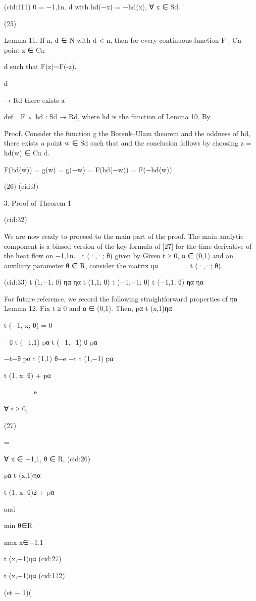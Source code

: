 {(cid:111)
0 = {−1,1}n.
d with hd(−x) = −hd(x), ∀ x ∈ Sd.

(25)

Lemma 11. If n, d ∈ N with d < n, then for every continuous function F : Cn
point z ∈ Cn

d such that F(z)=F(-z).

d

→ Rd there exists a

def= F ◦ hd : Sd → Rd, where hd is the function of Lemma 10. By

Proof. Consider the function g
the Borsuk–Ulam theorem and the oddness of hd, there exists a point w ∈ Sd such that
and the conclusion follows by choosing z = hd(w) ∈ Cn
d.

F(hd(w)) = g(w) = g(−w) = F(hd(−w)) = F(−hd(w))

(26)
(cid:3)

3. Proof of Theorem 1

(cid:32)

We are now ready to proceed to the main part of the proof. The main analytic component is
a biased version of the key formula of [27] for the time derivative of the heat ﬂow on {−1,1}n.

t (·,·; θ) given by
Given t ≥ 0, α ∈ (0,1) and an auxiliary parameter θ ∈ R, consider the matrix ηα





 .
t (·,·; θ).

(cid:33)
t (1,−1; θ)
ηα
ηα
t (1,1; θ)
t (−1,−1; θ)
t (−1,1; θ) ηα
ηα

For future reference, we record the following straightforward properties of ηα
Lemma 12. Fix t ≥ 0 and α ∈ (0,1). Then,
pα
t (x,1)ηα

t (−1, x; θ) = 0

−θ
t (−1,1)
pα
t (−1,−1)
θ
pα

−t−θ
pα
t (1,1)
θ−e
−t
t (1,−1)
pα

t (1, x; θ) + pα







 e

∀ t ≥ 0,

(27)

=

∀ x ∈ {−1,1}, θ ∈ R,
(cid:26)

pα
t (x,1)ηα

t (1, x; θ)2 + pα

and

min
θ∈R

max
x∈{−1,1}

t (x,−1)ηα
(cid:27)

t (x,−1)ηα
(cid:112)

(et − 1)(

}
